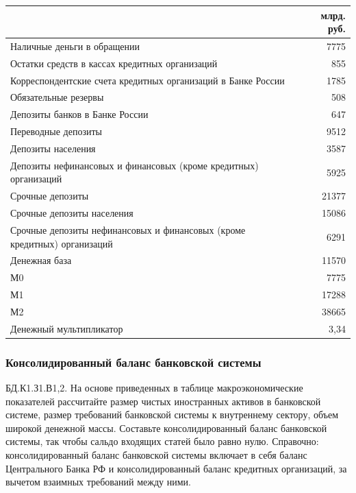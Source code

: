 \documentclass[12pt, table, a4paper,twoside]{exam}
\begin{document}
\begin{questions}
\begin{solution}[12em]
	\begin{tabularx}{\linewidth}[b]{@{}>{\raggedright\arraybackslash}Xr@{}}				& млрд. руб.\\
		\toprule
		\small
		Наличные деньги в обращении & 7775 \\
		Остатки средств в кассах кредитных организаций & 855 \\
		Корреспондентские счета кредитных организаций в Банке России & 1785 \\
		Обязательные резервы & 508 \\
		Депозиты банков в Банке России & 647 \\
		Переводные депозиты & 9512 \\
		Депозиты населения & 3587 \\
		Депозиты нефинансовых и финансовых (кроме кредитных) организаций & 5925 \\
		Срочные депозиты & 21377 \\
		Срочные депозиты населения & 15086 \\
		Срочные депозиты нефинансовых и финансовых (кроме кредитных) организаций & 6291 \\
		\midrule
		Денежная база & 11570 \\
		М0    & 7775 \\
		М1    & 17288 \\
		М2    & 38665 \\
		Денежный мультипликатор	&3,34\\		
		\bottomrule
	\end{tabularx}%
	
\end{solution}

\subsubsection{Консолидированный баланс банковской системы}
\question[15] БД.К1.З1.В1,2. На основе приведенных в таблице макроэкономические показателей рассчитайте размер чистых иностранных активов в банковской системе, размер требований банковской системы к внутреннему сектору, объем широкой денежной массы. Составьте консолидированный баланс банковской системы, так чтобы сальдо входящих статей было равно нулю. Справочно: консолидированный баланс банковской системы включает в себя баланс Центрального Банка РФ и консолидированный баланс кредитных организаций, за вычетом взаимных требований между ними.


\end{questions}
\end{document}
